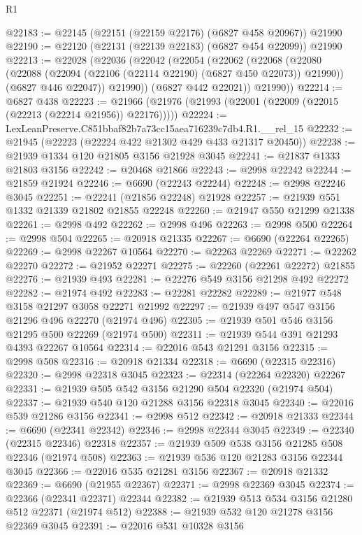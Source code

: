 \begin{lexlean}{R1}
\begin{coremodule}
@22183 := @22145 (@22151 (@22159 @22176) (@6827 @458 @20967)) @21990
@22190 := @22120 (@22131 (@22139 @22183) (@6827 @454 @22099)) @21990
@22213 := @22028
    (@22036
      (@22042
        (@22054
          (@22062
            (@22068
              (@22080
                (@22088 (@22094 (@22106 (@22114 @22190) (@6827 @450 @22073)) @21990))
                (@6827 @446 @22047))
              @21990))
          (@6827 @442 @22021))
        @21990))
@22214 := @6827 @438
@22223 := @21966 (@21976 (@21993 (@22001 (@22009 (@22015 (@22213 (@22214 @21956)) @22176)))))
@22224 := LexLeanPreserve.C851bbaf82b7a73cc15aea716239c7db4.R1.__rel_15
@22232 := @21945 (@22223 (@22224 @422 @21302 @429 @433 @21317 @20450))
@22238 := @21939 @1334 @120 @21805 @3156 @21928 @3045
@22241 := @21837 @1333 @21803 @3156
@22242 := @20468 @21866
@22243 := @2998 @22242
@22244 := @21859 @21924
@22246 := @6690 (@22243 @22244)
@22248 := @2998 @22246 @3045
@22251 := @22241 (@21856 @22248) @21928
@22257 := @21939 @551 @1332 @21339 @21802 @21855 @22248
@22260 := @21947 @550 @21299 @21338
@22261 := @2998 @492
@22262 := @2998 @496
@22263 := @2998 @500
@22264 := @2998 @504
@22265 := @20918 @21335
@22267 := @6690 (@22264 @22265)
@22269 := @2998 @22267 @10564
@22270 := @22263 @22269
@22271 := @22262 @22270
@22272 := @21952 @22271
@22275 := @22260 (@22261 @22272) @21855
@22276 := @21939 @493
@22281 := @22276 @549 @3156 @21298 @492 @22272
@22282 := @21974 @492
@22283 := @22281 @22282
@22289 := @21977 @548 @3158 @21297 @3058 @22271 @21992
@22297 := @21939 @497 @547 @3156 @21296 @496 @22270 (@21974 @496)
@22305 := @21939 @501 @546 @3156 @21295 @500 @22269 (@21974 @500)
@22311 := @21939 @544 @391 @21293 @4393 @22267 @10564
@22314 := @22016 @543 @21291 @3156
@22315 := @2998 @508
@22316 := @20918 @21334
@22318 := @6690 (@22315 @22316)
@22320 := @2998 @22318 @3045
@22323 := @22314 (@22264 @22320) @22267
@22331 := @21939 @505 @542 @3156 @21290 @504 @22320 (@21974 @504)
@22337 := @21939 @540 @120 @21288 @3156 @22318 @3045
@22340 := @22016 @539 @21286 @3156
@22341 := @2998 @512
@22342 := @20918 @21333
@22344 := @6690 (@22341 @22342)
@22346 := @2998 @22344 @3045
@22349 := @22340 (@22315 @22346) @22318
@22357 := @21939 @509 @538 @3156 @21285 @508 @22346 (@21974 @508)
@22363 := @21939 @536 @120 @21283 @3156 @22344 @3045
@22366 := @22016 @535 @21281 @3156
@22367 := @20918 @21332
@22369 := @6690 (@21955 @22367)
@22371 := @2998 @22369 @3045
@22374 := @22366 (@22341 @22371) @22344
@22382 := @21939 @513 @534 @3156 @21280 @512 @22371 (@21974 @512)
@22388 := @21939 @532 @120 @21278 @3156 @22369 @3045
@22391 := @22016 @531 @10328 @3156

\end{coremodule}
\end{lexlean}
